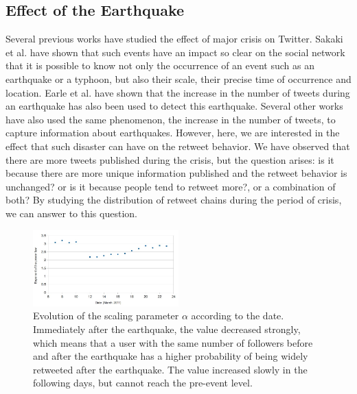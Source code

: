 \documentclass[conference]{IEEEtran}
\begin{document}
\subsection{Effect of the Earthquake}
Several previous works have studied the effect of major crisis on Twitter. Sakaki et al. \cite{sakaki2010earthquake} have shown that such events have an impact so clear on the social network that it is possible to know not only the occurrence of an event such as an earthquake or a typhoon, but also their scale, their precise time of occurrence and location. Earle et al. \cite{earle2010omg} have shown that the increase in the number of tweets during an earthquake has also been used to detect this earthquake. Several other works \cite{mendoza2010twitter} \cite{li2010twitter}  have also used the same phenomenon, the increase in the number of tweets, to capture information about earthquakes.
However, here, we are interested in the effect that such disaster can have on the retweet behavior. We have observed that there are more tweets published during the crisis, but the question arises: is it because there are more unique information published and the retweet behavior is unchanged? or is it because people tend to retweet more?, or a combination of both? By studying the distribution of retweet chains during the period of crisis, we can answer to this question.

 \begin{figure}[h]
\includegraphics[width=0.5\textwidth]{data/evolutionAlpha.jpg}
\caption{Evolution of the scaling parameter $\alpha$ according to the date. Immediately after the earthquake, the value decreased strongly, which means that a user with the same number of followers before and after the earthquake has a higher probability of being widely retweeted after the earthquake. The value increased slowly in the following days, but cannot reach the pre-event level.}

    \label{fig:evolutionAlphaDate}
\end{figure}
\end{document}
